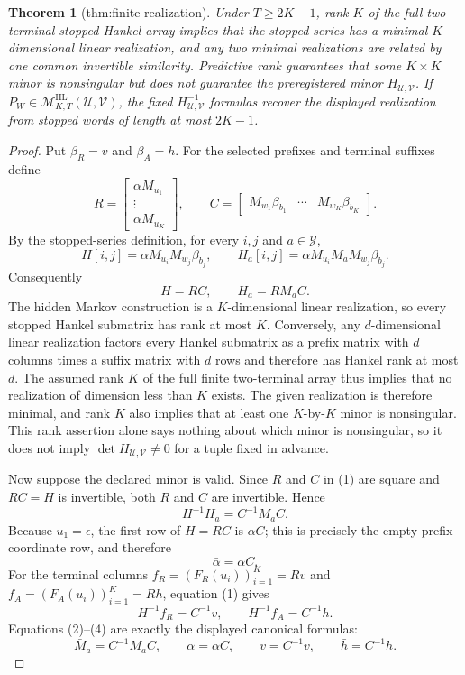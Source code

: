 \documentclass{article}
\newtheorem{theorem}{Theorem}
\begin{document}
\begin{theorem}[thm:finite-realization]\label{thm:finite-realization}
Under \(T\ge2K-1\), rank \(K\) of the full two-terminal stopped Hankel array implies that the stopped series has a minimal \(K\)-dimensional linear realization, and any two minimal realizations are related by one common invertible similarity. Predictive rank guarantees that some \(K\times K\) minor is nonsingular but does not guarantee the preregistered minor \(H_{\mathcal U,\mathcal V}\). If \(P_W\in\mathcal M^{\mathrm{HL}}_{K,T}(\mathcal U,\mathcal V)\), the fixed \(H_{\mathcal U,\mathcal V}^{-1}\) formulas recover the displayed realization from stopped words of length at most \(2K-1\).
\end{theorem}
\begin{proof}
Put \(\beta_R=v\) and \(\beta_A=h\).  For the selected prefixes and terminal suffixes define
\[
 R=\begin{bmatrix}\alpha M_{u_1}\\ \vdots\\ \alpha M_{u_K}\end{bmatrix},
 \qquad
 C=\begin{bmatrix}M_{w_1}\beta_{b_1}&\cdots&M_{w_K}\beta_{b_K}\end{bmatrix}.
\]
By the stopped-series definition, for every \(i,j\) and \(a\in\mathcal Y\),
\[
 H[i,j]=\alpha M_{u_i}M_{w_j}\beta_{b_j},
 \qquad
 H_a[i,j]=\alpha M_{u_i}M_aM_{w_j}\beta_{b_j}.
\]
Consequently
\[
 H=RC,
 \qquad
 H_a=RM_aC.                                                    \tag{1}
\]
The hidden Markov construction is a \(K\)-dimensional linear realization, so every stopped Hankel submatrix has rank at most \(K\).  Conversely, any \(d\)-dimensional linear realization factors every Hankel submatrix as a prefix matrix with \(d\) columns times a suffix matrix with \(d\) rows and therefore has Hankel rank at most \(d\).  The assumed rank \(K\) of the full finite two-terminal array thus implies that no realization of dimension less than \(K\) exists.  The given realization is therefore minimal, and rank \(K\) also implies that at least one \(K\)-by-\(K\) minor is nonsingular.  This rank assertion alone says nothing about which minor is nonsingular, so it does not imply \(\det H_{\mathcal U,\mathcal V}\ne0\) for a tuple fixed in advance.

Now suppose the declared minor is valid.  Since \(R\) and \(C\) in (1) are square and \(RC=H\) is invertible, both \(R\) and \(C\) are invertible.  Hence
\[
 H^{-1}H_a=C^{-1}M_aC.                                         \tag{2}
\]
Because \(u_1=\epsilon\), the first row of \(H=RC\) is \(\alpha C\); this is precisely the empty-prefix coordinate row, and therefore
\[
 \bar\alpha=\alpha C.                                         \tag{3}
\]
For the terminal columns \(f_R=(F_R(u_i))_{i=1}^K=Rv\) and \(f_A=(F_A(u_i))_{i=1}^K=Rh\), equation (1) gives
\[
 H^{-1}f_R=C^{-1}v,
 \qquad
 H^{-1}f_A=C^{-1}h.                                            \tag{4}
\]
Equations (2)--(4) are exactly the displayed canonical formulas:
\[
 \bar M_a=C^{-1}M_aC,
 \qquad
 \bar\alpha=\alpha C,
 \qquad
 \bar v=C^{-1}v,
 \qquad
 \bar h=C^{-1}h.                                               \tag{5}
\]


\end{proof}
\end{document}
